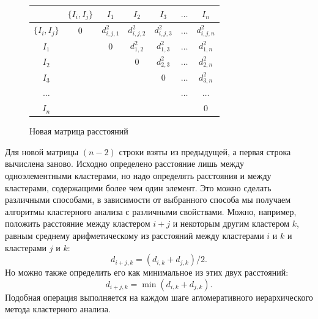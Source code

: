\documentclass[a4paper,14pt,openany,final]{extreport} %
\def\oldcaption{} \let\oldcaption=\caption
\def\caption{\stepcounter{captionsnum}\oldcaption}
\begin{document}
\begin{figure}[htbp]
  \centering
  \begin{tabular}{|c||c|c|c|c|c|c|}
    \hline
                  & $\{I_i,I_j\}$ & $I_1$         & $I_2$         & $I_3$         & $\ldots$ & $I_n$        \\
    \hline
    \hline
    $\{I_i,I_j\}$ &  0            & $d_{i,j,1}^2$ & $d_{i,j,2}^2$ & $d_{i,j,3}^2$ & $\ldots$ & $d_{i,j,n}^2$  \\
    \hline
    $I_1$ & & 0     & $d_{1,2}^2$ & $d_{1,3}^2$ & $\ldots$ & $d_{1,n}^2$  \\
    \hline
    $I_2$ & &      & 0           & $d_{2,3}^2$ & $\ldots$ & $d_{2,n}^2$  \\
    \hline
    $I_3$ & &      &             & 0           & $\ldots$ & $d_{3,n}^2$  \\
    \hline
 $\ldots$ & &      &             &             & $\ldots$ & $\ldots$ \\
    \hline
    $I_n$ & &      &             &             &          & 0  \\
    \hline
  \end{tabular}
  \caption{Новая матрица расстояний}
  \label{fig:disssimmnew}
\end{figure}
Для новой матрицы $(n-2)$ строки взяты из предыдущей, а первая строка вычислена заново. Исходно определено расстояние лишь между одноэлементными кластерами, но надо определять расстояния и между кластерами, содержащими более чем один элемент. Это можно сделать различными способами, в зависимости от выбранного способа мы получаем алгоритмы кластерного анализа с различными свойствами. Можно, например, положить расстояние между кластером $i + j$ и некоторым другим кластером $k$, равным среднему арифметическому из расстояний между кластерами $i$ и $k$ и кластерами $j$ и $k$:
\[d_{i+j,k}=(d_{i,k}+d_{j,k})/2.\]
Но можно также определить его как минимальное из этих двух расстояний:
\[d_{i+j,k}=\min⁡(d_{i,k}+d_{j,k}).\]
Подобная операция выполняется на каждом шаге агломеративного иерархического метода кластерного анализа.
\end{document}
